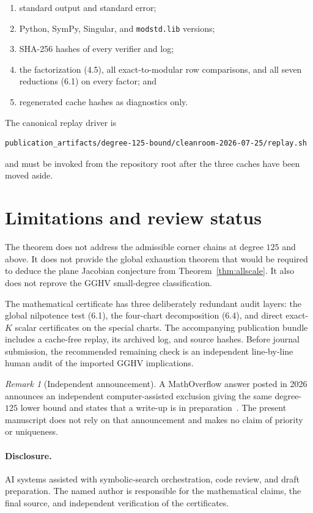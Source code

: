 \documentclass[11pt]{article}
\theoremstyle{definition}
\theoremstyle{remark}
\newtheorem{remark}[theorem]{Remark}
\begin{document}
\begin{enumerate}
\item standard output and standard error;
\item Python, SymPy, Singular, and \texttt{modstd.lib} versions;
\item SHA-256 hashes of every verifier and log;
\item the factorization (4.5), all exact-to-modular row comparisons, and
  all seven reductions (6.1) on every factor; and
\item regenerated cache hashes as diagnostics only.
\end{enumerate}
The canonical replay driver is
\begin{verbatim}
publication_artifacts/degree-125-bound/cleanroom-2026-07-25/replay.sh
\end{verbatim}
and must be invoked from the repository root after the three caches have
been moved aside.

\section{Limitations and review status}

The theorem does not address the admissible corner chains at degree
\(125\) and above.  It does not provide the global exhaustion theorem
that would be required to deduce the plane Jacobian conjecture from
Theorem~\ref{thm:allscale}.  It also does not reprove the GGHV
small-degree classification.

The mathematical certificate has three deliberately redundant audit
layers: the global nilpotence test (6.1), the four-chart decomposition
(6.4), and direct exact-\(K\) scalar certificates on the special charts.
The accompanying publication bundle includes a cache-free replay, its
archived log, and source hashes.  Before journal submission, the
recommended remaining check is an independent line-by-line human audit
of the imported GGHV implications.

\begin{remark}[Independent announcement]\label{rem:priority}
A MathOverflow answer posted in 2026 announces an independent
computer-assisted exclusion giving the same degree-\(125\) lower bound
and states that a write-up is in preparation~\cite{MO2026}.  The present
manuscript does not rely on that announcement and makes no claim of
priority or uniqueness.
\end{remark}

\paragraph{Disclosure.}
AI systems assisted with symbolic-search orchestration, code review, and
draft preparation.  The named author is responsible for the mathematical
claims, the final source, and independent verification of the
certificates.
\end{document}
